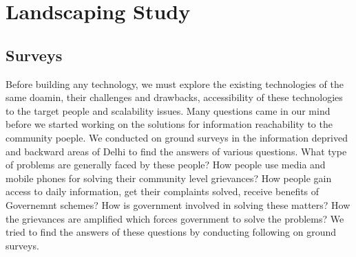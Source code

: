 \chapter{Landscaping Study}


\section {Surveys}
Before building any technology, we must explore the existing technologies of the same doamin, their challenges and drawbacks, accessibility of these technologies to the target people and scalability issues. Many questions came in our mind before we started working on the solutions for information reachability to the community poeple. We  conducted on ground surveys in the information deprived and backward areas of Delhi to find the answers of various questions. What type of problems are generally faced by these people? How people use media and mobile phones for solving their community level grievances? How people gain access to daily information, get their complaints solved, receive benefits of Governemnt schemes? How is government involved in solving these matters? How the grievances are amplified which forces government to solve the problems? We tried to find the answers of these questions by conducting following on ground surveys.

